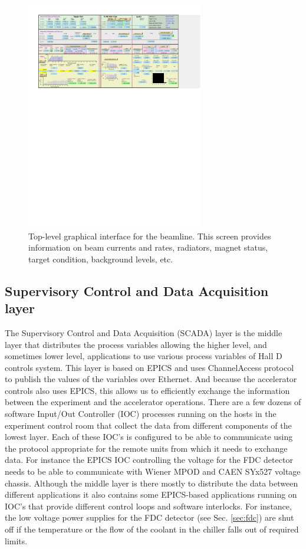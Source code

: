 \begin{landscape}
 \begin{figure}[tbp]
\begin{center}
\includegraphics[height=10cm,bb=35 480 535 760,clip=true]{figures/GlueX_CSS_overview.pdf}
\caption{Top-level graphical interface for the beamline. This screen provides information on beam currents and rates, radiators, magnet status, target condition, background levels, etc.
\label{fig:GlueX_CSS_overview}
}
\end{center}
\end{figure}
\end{landscape}

\subsection{Supervisory Control and Data Acquisition layer \label{sec:archiver}}
The Supervisory Control and Data Acquisition (SCADA) layer is the middle layer that distributes the process variables allowing the higher level, and sometimes lower level, applications to use various process variables of Hall D controls system. This layer is based on EPICS and uses ChannelAccess protocol to publish the values of the variables over Ethernet. And because the accelerator controls also uses EPICS, this allows us to efficiently exchange the information between the experiment and the accelerator operations. There are a few dozens of software Input/Out Controller (IOC) processes running on the hosts in the experiment control room that collect the data from different components of the lowest layer. Each of these IOC's is configured to be able to communicate using the protocol appropriate for the remote units from which it needs to exchange data. For instance the EPICS IOC controlling the voltage for the FDC detector needs to be able to communicate with Wiener MPOD and CAEN SYx527 voltage chassis. Although the middle layer is there mostly to distribute the data between different applications it also contains some EPICS-based applications running on IOC's that provide different control loops and software interlocks.  For instance, the low voltage power supplies for the FDC detector (see Sec. \ref{sec:fdc}) are shut off if the temperature or the flow of the coolant in the chiller falls out of required limits. 

